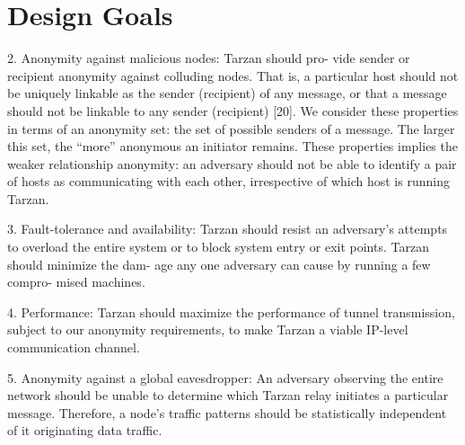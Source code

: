 \section{Design Goals}
2. Anonymity against malicious nodes: Tarzan should pro- vide sender or recipient anonymity against colluding nodes. That is, a particular host should not be uniquely linkable as the sender (recipient) of any message, or that a message should not be linkable to any sender (recipient) [20]. We consider these properties in terms of an anonymity set: the set of possible senders of a message. The larger this set, the “more” anonymous an initiator remains. These properties implies the weaker relationship anonymity: an adversary should not be able to identify a pair of hosts as communicating with each other, irrespective of which host is running Tarzan.

3. Fault-tolerance and availability: Tarzan should resist an adversary’s attempts to overload the entire system or to block system entry or exit points. Tarzan should minimize the dam- age any one adversary can cause by running a few compro- mised machines.

4. Performance: Tarzan should maximize the performance of tunnel transmission, subject to our anonymity requirements, to make Tarzan a viable IP-level communication channel.

5. Anonymity against a global eavesdropper: An adversary observing the entire network should be unable to determine which Tarzan relay initiates a particular message. Therefore, a node’s traffic patterns should be statistically independent of it originating data traffic.


